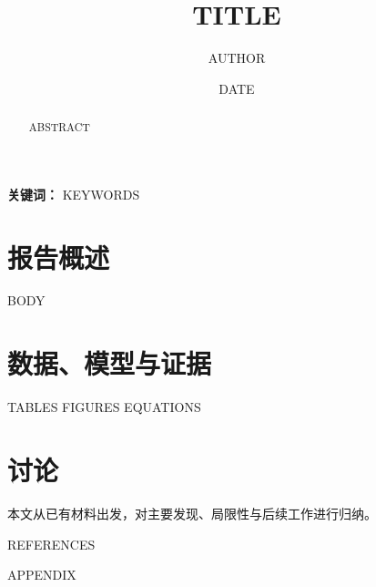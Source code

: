 \documentclass[UTF8,a4paper,zihao=-4]{ctexart}
\title{{{TITLE}}}
\author{{{AUTHOR}}}
\date{{{DATE}}}
\begin{document}
\maketitle

\begin{abstract}
{{ABSTRACT}}
\end{abstract}

\noindent\textbf{关键词：} {{KEYWORDS}}

\section{报告概述}
{{BODY}}

\section{数据、模型与证据}
{{TABLES}}
{{FIGURES}}
{{EQUATIONS}}

\section{讨论}
本文从已有材料出发，对主要发现、局限性与后续工作进行归纳。

{{REFERENCES}}

{{APPENDIX}}
\end{document}
